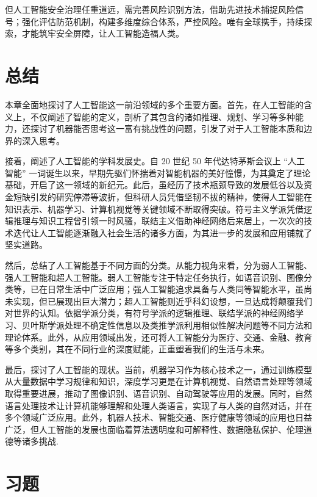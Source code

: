 但人工智能安全治理任重道远，需完善风险识别方法，借助先进技术捕捉风险信号；强化评估防范机制，构建多维度综合体系，严控风险。唯有全球携手，持续探索，才能筑牢安全屏障，让人工智能造福人类。


\section{总结}
本章全面地探讨了人工智能这一前沿领域的多个重要方面。首先，在人工智能的含义上，不仅阐述了智能的定义，剖析了其包含的诸如推理、规划、学习等多种能力，还探讨了机器能否思考这一富有挑战性的问题，引发了对于人工智能本质和边界的深入思考。


接着，阐述了人工智能的学科发展史。自 20 世纪 50 年代达特茅斯会议上 “人工智能” 一词诞生以来，早期先驱们怀揣着对智能机器的美好憧憬，为其奠定了理论基础，开启了这一领域的新纪元。此后，虽经历了技术瓶颈导致的发展低谷以及资金短缺引发的研究停滞等波折，但科研人员凭借坚韧不拔的精神，使得人工智能在知识表示、机器学习、计算机视觉等关键领域不断取得突破。符号主义学派凭借逻辑推理与知识工程曾引领一时风骚，联结主义借助神经网络后来居上，一次次的技术迭代让人工智能逐渐融入社会生活的诸多方面，为其进一步的发展和应用铺就了坚实道路。


然后，总结了人工智能基于不同方面的分类。从能力视角来看，分为弱人工智能、强人工智能和超人工智能。弱人工智能专注于特定任务执行，如语音识别、图像分类等，已在日常生活中广泛应用；强人工智能追求具备与人类同等智能水平，虽尚未实现，但已展现出巨大潜力；超人工智能则近乎科幻设想，一旦达成将颠覆我们对世界的认知。依据学派分类，有符号学派的逻辑推理、联结学派的神经网络学习、贝叶斯学派处理不确定性信息以及类推学派利用相似性解决问题等不同方法和理论体系。此外，从应用领域出发，还可将人工智能分为医疗、交通、金融、教育等多个类别，其在不同行业的深度赋能，正重塑着我们的生活与未来。


最后，探讨了人工智能的现状。当前，机器学习作为核心技术之一，通过训练模型从大量数据中学习规律和知识，深度学习更是在计算机视觉、自然语言处理等领域取得重要进展，推动了图像识别、语音识别、自动驾驶等应用的发展。同时，自然语言处理技术让计算机能够理解和处理人类语言，实现了与人类的自然对话，并在多个领域广泛应用。此外，机器人技术、智能交通、医疗健康等领域的应用也日益广泛，但人工智能的发展也面临着算法透明度和可解释性、数据隐私保护、伦理道德等诸多挑战.


\section* {习题}

